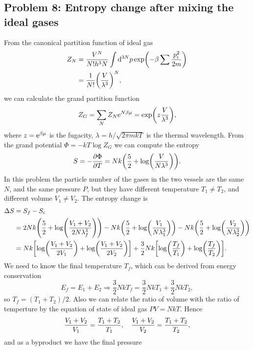 \documentclass[10pt]{article}
\begin{document}
\subsection{Problem 8: Entropy change after mixing the ideal gases}
From the canonical partition function of ideal gas 
\begin{align*}
	Z_N &= \frac{V^N}{N! h^3N} \int \dd[3N]{p} \exp(-\beta \sum \frac{p_i^2}{2m}) \\
		&=\frac{1}{N!} \qty(\frac{V}{\lambda^3})^N,
\end{align*}
we can calculate the grand partition function 
\begin{equation}
	Z_G = \sum_N Z_N {\mathrm{e}}^{N \beta \mu} = \exp(z \frac{V}{\lambda^3}) ,
\end{equation}
where $z = {\mathrm{e}}^{\beta \mu}$ is the fugacity, $\lambda = h / \sqrt{2\pi m k T}$ is the thermal wavelength. 
From the grand potential $\Phi = - k T \log Z_G$ we can compute the entropy 
\begin{equation}
	S = - \pdv{\Phi}{T} = Nk \qty(\frac{5}{2} + \log(\frac{V}{N \lambda^3})).
\end{equation}
In this problem the particle number of the gases in the two vessels are the same $N$, and the same pressure $P$, but they have different temperature  $T_1 \neq T_2$, and different volume $V_1 \neq V_2$. The entropy change is 
\begin{align*}
	\Delta S  &= S_f - S_i \\
			  &= 2Nk \qty(\frac{5}{2} + \log(\frac{V_1 + V_2}{2N \lambda_f^3})) -Nk \qty(\frac{5}{2} + \log(\frac{V_1}{N \lambda_1^3})) - Nk \qty(\frac{5}{2} + \log(\frac{V_2}{N \lambda_2^3})) \\
			  &= Nk \qty[\log(\frac{V_1 + V_2}{2V_1}) + \log(\frac{V_1 + V_2}{2V_2})] + \frac{3}{2}Nk \qty[\log(\frac{T_f}{T_1}) + \log(\frac{T_f}{T_2})].
\end{align*}
We need to know the final temperature $T_f$, which can be derived from energy conservation 
\begin{equation}
	E_f = E_1 + E_2 \Longrightarrow \frac{3}{2}Nk T_f = \frac{3}{2} NkT_1 + \frac{3}{2} Nk T_2,
\end{equation}
so $T_f = (T_1 + T_2) / 2$. Also we can relate the ratio of volume with the ratio of temperture by the equation of state of ideal gas $PV = NkT$. Hence 
 \begin{equation}
 	\frac{V_1 + V_2}{V_1} = \frac{T_1 + T_2}{T_1}\qc \frac{V_1 + V_2}{V_2} = \frac{T_1 + T_2}{T_2},
 \end{equation}
and as a byproduct we have the final pressure 
\end{document}
